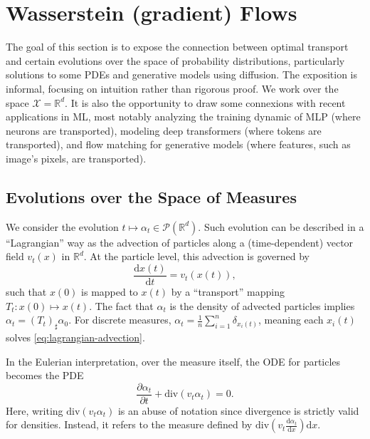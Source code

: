 
\section{Wasserstein (gradient) Flows}

The goal of this section is to expose the connection between optimal transport and certain evolutions over the space of probability distributions, particularly solutions to some PDEs and generative models using diffusion. The exposition is informal, focusing on intuition rather than rigorous proof. We work over the space $\mathcal{X} = \mathbb{R}^d$. It is also the opportunity to draw some connexions with recent applications in ML, most notably analyzing the training dynamic of MLP (where neurons are transported), modeling deep transformers (where tokens are transported), and flow matching for generative models (where features, such as image's pixels, are transported).

\subsection{Evolutions over the Space of Measures}

We consider the evolution $t \mapsto \alpha_t \in \mathcal{P}(\mathbb{R}^d)$. Such evolution can be described in a ``Lagrangian'' way as the advection of particles along a (time-dependent) vector field $v_t(x)$ in $\mathbb{R}^d$. At the particle level, this advection is governed by 
\begin{equation}
    \frac{\mathrm{d}x(t)}{\mathrm{d}t} = v_t(x(t)), \label{eq:lagrangian-advection}
\end{equation}
such that $x(0)$ is mapped to $x(t)$ by a ``transport'' mapping $T_t : x(0) \mapsto x(t)$. The fact that $\alpha_t$ is the density of advected particles implies $\alpha_t = (T_t)_\sharp \alpha_0$. For discrete measures, $\alpha_t = \frac{1}{n} \sum_{i=1}^n \delta_{x_i(t)}$, meaning each $x_i(t)$ solves \eqref{eq:lagrangian-advection}.

In the Eulerian interpretation, over the measure itself, the ODE for particles becomes the PDE
\begin{equation}
    \frac{\partial \alpha_t}{\partial t} + \mathrm{div}(v_t \alpha_t) = 0. \label{eq:eulerian-advection}
\end{equation}
Here, writing $\mathrm{div}(v_t \alpha_t)$ is an abuse of notation since divergence is strictly valid for densities. Instead, it refers to the measure defined by $\mathrm{div}\left(v_t \frac{\mathrm{d} \alpha_t}{\mathrm{d} x}\right) \mathrm{d}x$.

